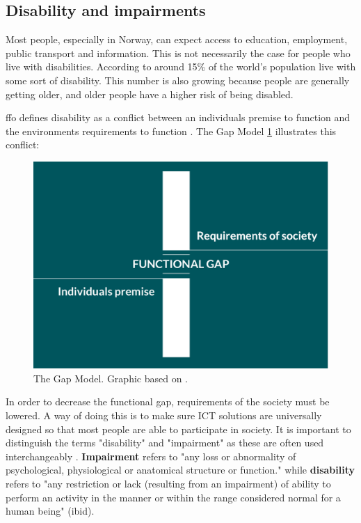 

\subsection{Disability and impairments}
Most people, especially in Norway, can expect access to education, employment, public transport and information. This is not necessarily the case for people who live with disabilities. According to \textcite{world_health_organization_world_2011} around 15\% of the world's population live with some sort of disability. This number is also growing because people are generally getting older, and older people have a higher risk of being disabled. 

\acrfull{ffo} defines disability as a conflict between an individuals premise to function and the environments requirements to function \parencite{funksjonshemmedes_fellesorganisasjon_ffo_definisjon_2013}. The Gap Model \ref{fig:gap_model} illustrates this conflict: 
\begin{figure}[H]
  \includegraphics[width=\linewidth]{img/gapmodel.png}
  \caption{The Gap Model. Graphic based on \textcite{difi_kvifor_2016}.}\label{fig:gap_model}
\endminipage\hfill
\end{figure}
In order to decrease the functional gap, requirements of the society must be lowered. A way of doing this is to make sure ICT solutions are universally designed so that most people are able to participate in society. 
It is important to distinguish the terms "disability" and "impairment" as these are often used interchangeably \parencite{sheena_l._carter_impairment_????}. \textbf{Impairment} refers to "any loss or abnormality of psychological, physiological or anatomical structure or function." while \textbf{disability} refers to "any restriction or lack (resulting from an impairment) of ability to perform an activity in the manner or within the range considered normal for a human being" (ibid). 

